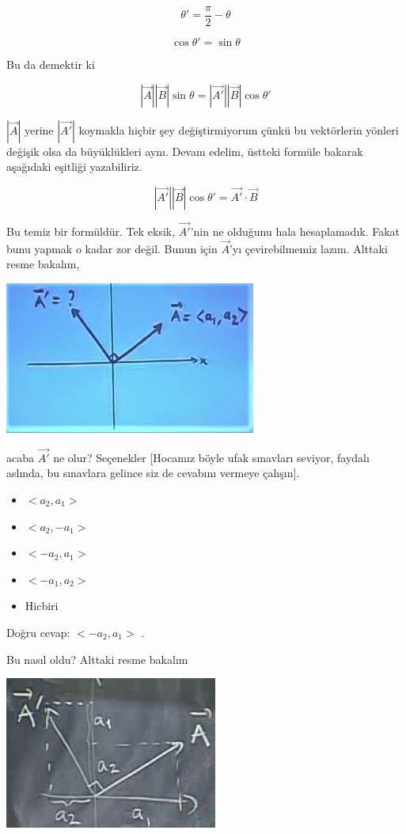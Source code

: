 \documentclass[12pt,fleqn]{article}\usepackage{../../common}
\begin{document}
$$ \theta' = \frac{\pi}{2} - \theta $$

$$ \cos \theta' = \sin \theta $$

Bu da demektir ki 

$$ |\vec{A}||\vec{B}|\sin\theta = |\vec{A'}||\vec{B}|\cos\theta'  $$

$|\vec{A}|$ yerine $|\vec{A'}|$ koymakla hiçbir şey değiştirmiyorum çünkü bu
vektörlerin yönleri değişik olsa da büyüklükleri aynı. Devam edelim, üstteki
formüle bakarak aşağıdaki eşitliği yazabiliriz.

$$ |\vec{A'}||\vec{B}|\cos\theta' = \vec{A'} \cdot \vec{B} $$

Bu temiz bir formüldür. Tek eksik, $\vec{A'}$'nin ne olduğunu hala
hesaplamadık. Fakat bunu yapmak o kadar zor değil. Bunun için $\vec{A}$'yı
çevirebilmemiz lazım. Alttaki resme bakalım,

\begin{center}
\includegraphics[height=5cm]{2_7.png}
\end{center}

acaba $\vec{A'}$ ne olur?  Seçenekler [Hocamız böyle ufak sınavları seviyor,
faydalı aslında, bu sınavlara gelince siz de cevabını vermeye çalışın].

\begin{itemize}
   \item $< a_2,a_1 >$
   \item $< a_2,-a_1 >$
   \item $< -a_2,a_1 >$
   \item $< -a_1,a_2 >$
   \item Hicbiri
\end{itemize}
Doğru cevap: $< -a_2,a_1 >$ . 

Bu nasıl oldu? Alttaki resme bakalım

\begin{center}
\includegraphics[height=5cm]{2_8.png}
\end{center}
\end{document}
